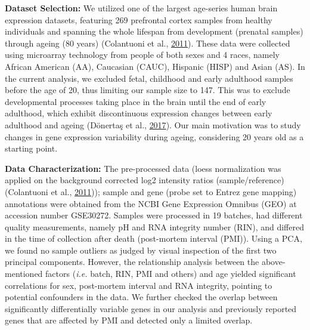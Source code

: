\documentclass[12pt,twoside]{unicam}
\begin{document}
\textbf{Dataset Selection:} We utilized one of the largest age-series human brain expression datasets, featuring 269 prefrontal cortex samples from healthy individuals and spanning the whole lifespan from development (prenatal samples) through ageing (80 years) (Colantuoni et al., \protect\hyperlink{ref-Colantuoni2011}{2011}). These data were collected using microarray technology from people of both sexes and 4 races, namely African American (AA), Caucasian (CAUC), Hispanic (HISP) and Asian (AS). In the current analysis, we excluded fetal, childhood and early adulthood samples before the age of 20, thus limiting our sample size to 147. This was to exclude developmental processes taking place in the brain until the end of early adulthood, which exhibit discontinuous expression changes between early adulthood and ageing (Dönertaş et al., \protect\hyperlink{ref-Donertas2017}{2017}). Our main motivation was to study changes in gene expression variability during ageing, considering 20 years old as a starting point.

\textbf{Data Characterization:} The pre-processed data (loess normalization was applied on the background corrected log2 intensity ratios (sample/reference)(Colantuoni et al., \protect\hyperlink{ref-Colantuoni2011}{2011})); sample and gene (probe set to Entrez gene mapping) annotations were obtained from the NCBI Gene Expression Omnibus (GEO) at accession number GSE30272. Samples were processed in 19 batches, had different quality measurements, namely pH and RNA integrity number (RIN), and differed in the time of collection after death (post-mortem interval (PMI)). Using a PCA, we found no sample outliers as judged by visual inspection of the first two principal components. However, the relationship analysis between the above-mentioned factors (\emph{i.e.} batch, RIN, PMI and others) and age yielded significant correlations for sex, post-mortem interval and RNA integrity, pointing to potential confounders in the data. We further checked the overlap between significantly differentially variable genes in our analysis and previously reported genes that are affected by PMI and detected only a limited overlap.
\end{document}
